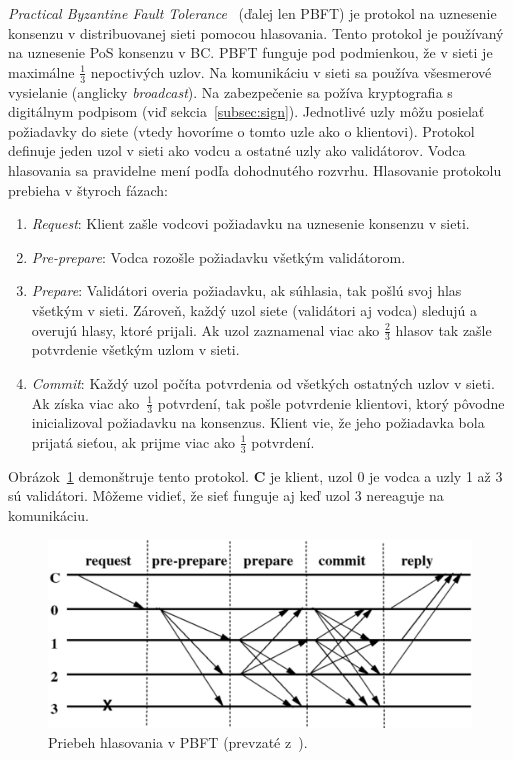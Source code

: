 \textit{Practical Byzantine Fault Tolerance}~\cite{pbftCastro} (ďalej len PBFT) je protokol na uznesenie konsenzu v distribuovanej sieti pomocou hlasovania. Tento protokol je používaný na uznesenie PoS konsenzu v BC. PBFT funguje pod podmienkou, že v sieti je maximálne $\frac{1}{3}$ nepoctivých uzlov. Na komunikáciu v sieti sa používa všesmerové vysielanie (anglicky \textit{broadcast}). Na zabezpečenie sa požíva kryptografia s digitálnym podpisom (viď sekcia~\ref{subsec:sign}). Jednotlivé uzly môžu posielať požiadavky do siete (vtedy hovoríme o tomto uzle ako o klientovi). Protokol definuje jeden uzol v sieti ako vodcu a ostatné uzly ako validátorov. Vodca hlasovania sa pravidelne mení podľa dohodnutého rozvrhu.
Hlasovanie protokolu prebieha v štyroch fázach:
\begin{enumerate}
	\item \textit{Request}: Klient zašle vodcovi požiadavku na uznesenie konsenzu v sieti.
	\item \textit{Pre-prepare}: Vodca rozošle požiadavku všetkým validátorom.
	\item \textit{Prepare}: Validátori overia požiadavku, ak súhlasia, tak pošlú svoj hlas všetkým v sieti. Zároveň, každý uzol siete (validátori aj vodca) sledujú a overujú hlasy, ktoré prijali. Ak uzol zaznamenal viac ako $\frac{2}{3}$ hlasov tak zašle potvrdenie všetkým uzlom v sieti. 
	\item \textit{Commit}: Každý uzol počíta potvrdenia od všetkých ostatných uzlov v sieti. Ak získa viac ako~$\frac{1}{3}$ potvrdení, tak pošle potvrdenie klientovi, ktorý pôvodne inicializoval požiadavku na konsenzus. Klient vie, že jeho požiadavka bola prijatá sieťou, ak prijme viac ako $\frac{1}{3}$ potvrdení.
\end{enumerate}
Obrázok~\ref{img:pbft} demonštruje tento protokol. \textbf{C} je klient, uzol 0 je vodca a uzly 1 až 3 sú validátori. Môžeme vidieť, že sieť funguje aj keď uzol 3 nereaguje na komunikáciu.
\begin{figure}[bt]
	\centering
	\includegraphics[width=.7\textwidth]{obrazky-figures/pbft}
	\caption{Priebeh hlasovania v PBFT (prevzaté z~\cite{pbftCastro}).}
	\label{img:pbft}
\end{figure}

